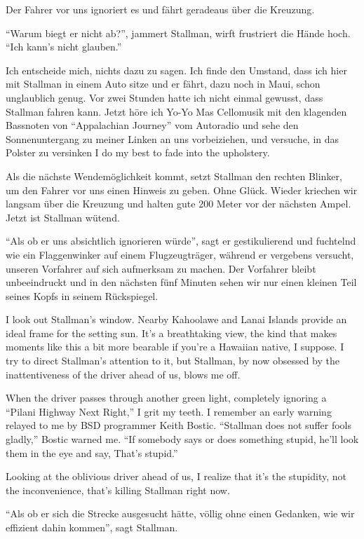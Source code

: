 Der Fahrer vor uns ignoriert es und fährt geradeaus über die Kreuzung.

"`Warum biegt er nicht ab?"', jammert Stallman, wirft frustriert die Hände hoch. "`Ich kann's nicht glauben."'

Ich entscheide mich, nichts dazu zu sagen. Ich finde den Umstand, dass ich hier mit Stallman in einem Auto sitze und er fährt, dazu noch in Maui, schon unglaublich genug. Vor zwei Stunden hatte ich nicht einmal gewusst, dass Stallman fahren kann. Jetzt höre ich Yo-Yo Mas Cellomusik mit den klagenden Bassnoten von "`Appalachian Journey"' vom Autoradio und sehe den Sonnenuntergang zu meiner Linken an uns vorbeiziehen, und versuche, in das Polster zu versinken I do my best to fade into the upholstery.

Als die nächste Wendemöglichkeit kommt, setzt Stallman den rechten Blinker, um den Fahrer vor uns einen Hinweis zu geben. Ohne Glück. Wieder kriechen wir langsam über die Kreuzung und halten gute 200 Meter vor der nächsten Ampel. Jetzt ist Stallman wütend.

"`Als ob er uns absichtlich ignorieren würde"', sagt er gestikulierend und fuchtelnd wie ein Flaggenwinker auf einem Flugzeugträger, während er vergebens versucht, unseren Vorfahrer auf sich aufmerksam zu machen. Der Vorfahrer bleibt unbeeindruckt und in den nächsten fünf Minuten sehen wir nur einen kleinen Teil seines Kopfs in seinem Rückspiegel.

I look out Stallman's window. Nearby Kahoolawe and Lanai Islands provide an ideal frame for the setting sun. It's a breathtaking view, the kind that makes moments like this a bit more bearable if you're a Hawaiian native, I suppose. I try to direct Stallman's attention to it, but Stallman, by now obsessed by the inattentiveness of the driver ahead of us, blows me off.

When the driver passes through another green light, completely ignoring a ``Pilani Highway Next Right,'' I grit my teeth. I remember an early warning relayed to me by BSD programmer Keith Bostic. ``Stallman does not suffer fools gladly,'' Bostic warned me. ``If somebody says or does something stupid, he'll look them in the eye and say, \glq That's stupid.\grq ''

Looking at the oblivious driver ahead of us, I realize that it's the stupidity, not the inconvenience, that's killing Stallman right now.

"`Als ob er sich die Strecke ausgesucht hätte, völlig ohne einen Gedanken, wie wir effizient dahin kommen"', sagt Stallman.

